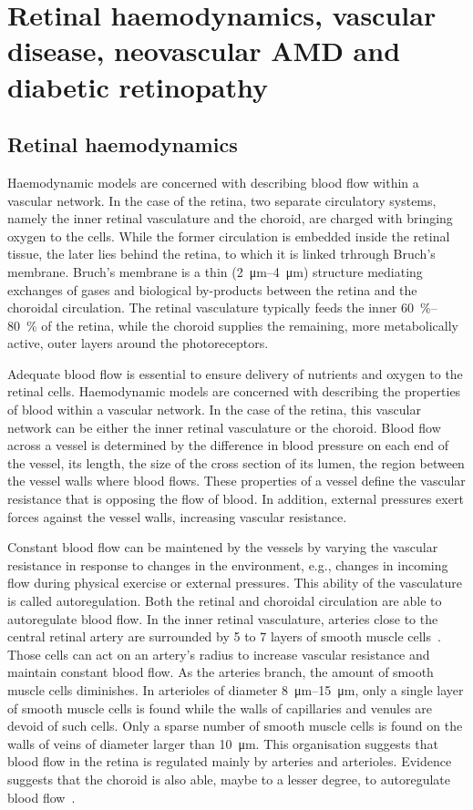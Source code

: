 \documentclass[12pt,a4paper]{journal}
\begin{document}
\section{Retinal haemodynamics, vascular disease, neovascular AMD and diabetic retinopathy}

\subsection{Retinal haemodynamics}

Haemodynamic models are concerned with describing blood flow within a vascular network.
In the case of the retina, two separate circulatory systems, namely the inner retinal vasculature and the choroid, are charged with bringing oxygen to the cells.
While the former circulation is embedded inside the retinal tissue, the later lies behind the retina, to which it is linked trhrough Bruch's membrane.
Bruch's membrane is a thin (\SIrange{2}{4}{\micro\meter}) structure mediating exchanges of gases and biological by-products between the retina and the choroidal circulation.
The retinal vasculature typically feeds the inner \SIrange{60}{80}{\percent} of the retina, while the choroid supplies the remaining, more metabolically active, outer layers around the photoreceptors.

Adequate blood flow is essential to ensure delivery of nutrients and oxygen to the retinal cells.
Haemodynamic models are concerned with describing the properties of blood within a vascular network.
In the case of the retina, this vascular network can be either the inner retinal vasculature or the choroid.
Blood flow across a vessel is determined by the difference in blood pressure on each end of the vessel, its length, the size of the cross section of its lumen, the region between the vessel walls where blood flows.
These properties of a vessel define the vascular resistance that is opposing the flow of blood.
In addition, external pressures exert forces against the vessel walls, increasing vascular resistance.

Constant blood flow can be maintened by the vessels by varying the vascular resistance in response to changes in the environment, e.g., changes in incoming flow during physical exercise or external pressures.
This ability of the vasculature is called autoregulation.
Both the retinal and choroidal circulation are able to autoregulate blood flow.
In the inner retinal vasculature, arteries close to the central retinal artery are surrounded by 5 to 7 layers of smooth muscle cells~\cite{An2020, Kur_2012}.
Those cells can act on an artery's radius to increase vascular resistance and maintain constant blood flow.
As the arteries branch, the amount of smooth muscle cells diminishes.
In arterioles of diameter \SIrange{8}{15}{\micro\meter}, only a single layer of smooth muscle cells is found while the walls of capillaries and venules are devoid of such cells. 
Only a sparse number of smooth muscle cells is found on the walls of veins of diameter larger than \SI{10}{\micro\meter}.
This organisation suggests that blood flow in the retina is regulated mainly by arteries and arterioles.
Evidence suggests that the choroid is also able, maybe to a lesser degree, to autoregulate blood flow~\cite{Polska2007}.
\end{document}
